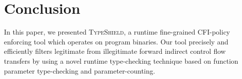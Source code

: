 \section{Conclusion}
\label{chapter:Conclusion}



In this paper, we presented \textsc{TypeShield}, a runtime fine-grained CFI-policy enforcing tool which 
operates on program binaries. Our tool precisely and efficiently filters legitimate from 
illegitimate forward indirect control flow transfers by using a novel runtime type-checking 
technique based on function parameter type-checking and parameter-counting. 

